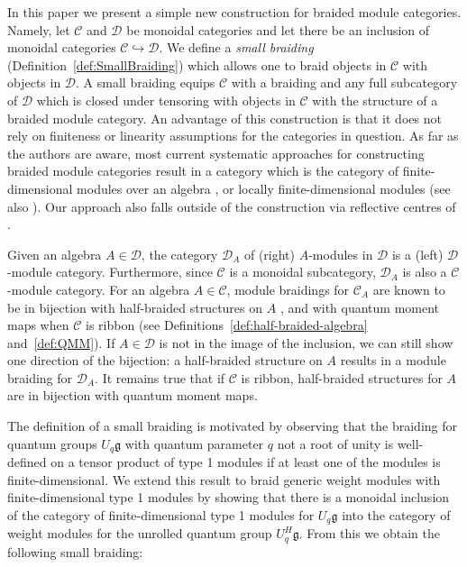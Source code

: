 \documentclass[12pt,dvipsnames]{article}
\numberwithin{equation}{section}
\theoremstyle{definition}
\newcommand{\cat}[1]{\mathcal{#1}}
\newcommand{\1}{\ensuremath{\mathbbm{1}}}
\begin{document}
In this paper we present a simple new construction for braided module categories. Namely, 
let $\cat{C}$ and $\cat{D}$ be monoidal categories and let there be an inclusion of monoidal categories $\cat{C}\hookrightarrow\cat{D}$. We define a \emph{small braiding} (Definition~\ref{def:SmallBraiding}) which allows one to braid objects in $\cat{C}$ with objects in $\cat{D}$. A small braiding equips $\cat{C}$ with a braiding and any full subcategory of $\cat{D}$ which is closed under tensoring with objects in $\cat{C}$ with the structure of a braided module category. An advantage of this construction is that it does not rely on finiteness or linearity assumptions for the categories in question. As far as the authors are aware, most current systematic approaches for constructing braided module categories result in a category which is the category of finite-dimensional modules over an algebra \cite{Ko17}, or locally finite-dimensional modules \cite{BBJ16} (see also \cite[Sec.\,1.3.2]{BBJ15}). Our approach also falls outside of the construction via reflective centres of \cite{LWY23}. 

Given an algebra $A\in\cat{D}$, the category $\cat{D}_A$ of (right) $A$-modules in $\cat{D}$ is a (left) $\cat{D}$-module category. Furthermore, since $\cat{C}$ is a monoidal subcategory, $\cat{D}_A$ is also a $\cat{C}$-module category. For an algebra $A\in\cat{C}$, module braidings for $\cat{C}_A$ are known to be in bijection with
half-braided structures on $A$
\cite[Sec.\,2.5]{JR21}, and with quantum moment maps when $\cat{C}$ is ribbon \cite[Cor.\,4.11]{BBJ16} 
(see Definitions~\ref{def:half-braided-algebra} and~\ref{def:QMM}). 
If $A\in\cat{D}$ is not in the image of the inclusion, we can still show one direction of the bijection:
a half-braided structure on
$A$ results in a module braiding for $\cat{D}_A$. It remains true that if $\cat{C}$ is ribbon, half-braided structures for $A$ are in bijection with quantum moment maps.

\medskip

The definition of a small braiding is motivated by observing that the braiding for quantum groups $U_q\mathfrak{g}$ with quantum parameter $q$ not a root of unity is well-defined on a tensor product of type 1 modules if at least one of the modules is finite-dimensional. We extend this result to braid generic weight modules with finite-dimensional type 1 modules by showing that there is a monoidal inclusion of the category of finite-dimensional type 1 modules for $U_q\mathfrak{g}$ into the category of weight modules for the unrolled quantum group $U_q^H\mathfrak{g}$. From this we obtain the following small braiding:
\end{document}
